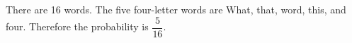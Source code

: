 There are 16 words. The five four-letter words are What, that, word, this, and four. Therefore the probability is $\boxed{\dfrac{5}{16}}$.
